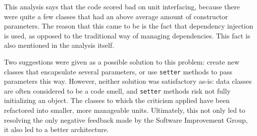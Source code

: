 This analysis says that the code scored bad on unit interfacing, because there
were quite a few classes that had an above average amount of constructor
parameters. The reason that this came to be is the fact that dependency
injection is used, as opposed to the traditional way of managing dependencies.
This fact is also mentioned in the analysis itself.

Two suggestions were given as a possible solution to this problem: create new
classes that encapsulate several parameters, or use \texttt{setter} methods
to pass parameters this way. However, neither solution was satisfactory as-is:
data classes are often considered to be a code smell, and \texttt{setter}
methods risk not fully initializing an object. The classes to which the
criticism applied have been refactored into smaller, more manageable units.
Ultimately, this not only led to resolving the only negative feedback made by
the Software Improvement Group, it also led to a better architecture.

